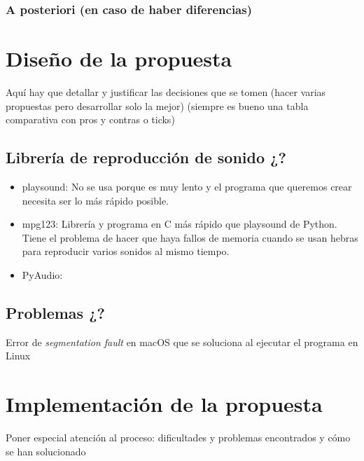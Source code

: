 \documentclass{article}
\begin{document}
 \subsubsection{A posteriori (en caso de haber diferencias)} 
 
 

\section{Diseño de la propuesta}

 Aquí hay que detallar y justificar las decisiones que se tomen (hacer varias propuestas pero desarrollar solo la mejor) (siempre es bueno una tabla comparativa con pros y contras o ticks)
 
 \subsection{Librería de reproducción de sonido ¿?}
 \begin{itemize}
     \item playsound\cite{playsound}: No se usa porque es muy lento y el programa que queremos crear necesita ser lo más rápido posible.
     \item mpg123\cite{mpg123}: Librería y programa en C más rápido que playsound de Python. Tiene el problema de hacer que haya fallos de memoria cuando se usan hebras para reproducir varios sonidos al mismo tiempo.
     \item PyAudio\cite{PyAudio}: %
 \end{itemize} 
 
 \subsection{Problemas ¿?}
 Error de \textit{segmentation fault} en macOS que se soluciona al ejecutar el programa en Linux 
 
\section{Implementación de la propuesta}

 Poner especial atención al proceso: dificultades y problemas encontrados y cómo se han solucionado
 
\end{document}
